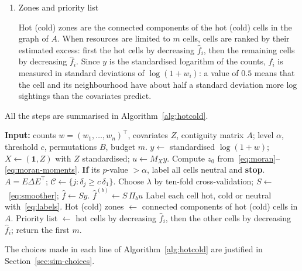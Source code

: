 \begin{enumerate}[label=Step \arabic*:]
In the simulation study and in the application, we use $B=999$, the usual choice for permutation tests, for which
the 5\% and 95\% quantiles fall on order statistics and the Monte Carlo standard error
of a tail probability of $0.05$ is about $0.007$. With smaller values the band is slightly too narrow: with the usual (linear interpolation) sample quantile, the probability that a cell is labelled hot under the null hypothesis is about $5.1\%$ for $B=999$, but $5.5\%$ for $B=200$ and $5.9\%$ for $B=100$.

\item Zones and priority list\label{sec:rank}

Hot (cold) zones are the connected components of the hot (cold) cells in the graph of $A$. When resources are limited to $m$ cells, cells are ranked by their estimated excess: first the hot cells by decreasing $\hat f_i$, then the remaining cells by decreasing $\hat f_i$. Since $y$ is the standardised logarithm of the counts, $\hat f_i$ is measured in standard deviations of $\log(1+w_i)$: a value of $0.5$ means that the cell and its neighbourhood have about half a standard deviation more log sightings than the covariates predict.
\end{enumerate}

All the steps are summarised in Algorithm~\ref{alg:hotcold}.

\begin{algorithm}[ht]
\caption{Covariate-adjusted hot and cold spots}\label{alg:hotcold}
\begin{algorithmic}[1]
\State \textbf{Input:} counts $w=(w_1,\dots,w_n)^\top$, covariates $Z$, contiguity matrix $A$; level $\alpha$, threshold $c$, permutations $B$, budget $m$.
\State $y\gets$ standardised $\log(1+w)$; $X\gets(\mathbf{1},Z)$ with $Z$ standardised; $u\gets M_Xy$.\label{alg:l-data}
\State Compute $z_0$ from~\eqref{eq:moran}--\eqref{eq:moran-moments}. \textbf{If} its $p$-value $>\alpha$, label all cells neutral and \textbf{stop}.\label{alg:l-test}
\State $A=E\Delta E^\top$; $\mathcal{C}\gets\{j:\delta_j\ge c\,\delta_1\}$.\label{alg:l-cand}
\State Choose $\lambda$ by ten-fold cross-validation; $S\gets$~\eqref{eq:smoother}; $\hat f\gets Sy$.\label{alg:l-fit}
\label{alg:l-perm}
  \State $\hat f^{(b)}\gets S\,\Pi_b u$ 
\EndFor
\State Label each cell hot, cold or neutral with~\eqref{eq:labels}.\label{alg:l-label}
\State Hot (cold) zones $\gets$ connected components of hot (cold) cells in $A$.
\State Priority list $\gets$ hot cells by decreasing $\hat f_i$, then the other cells by decreasing $\hat f_i$; return the first $m$.
\end{algorithmic}
\end{algorithm}

The choices made in each line of Algorithm~\ref{alg:hotcold} are justified in Section~\ref{sec:sim-choices}. 



